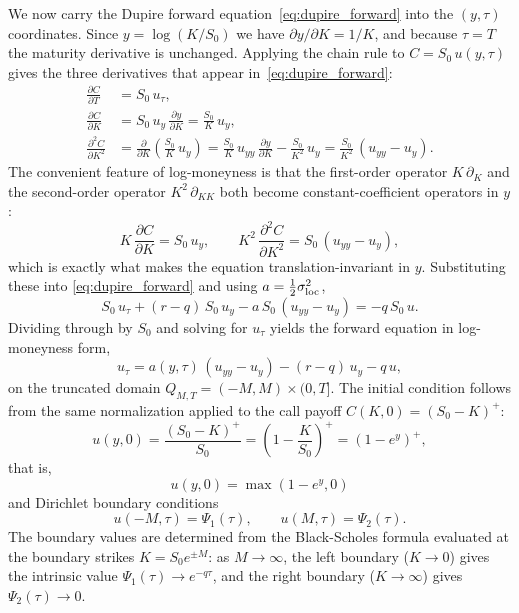 We now carry the Dupire forward equation~\eqref{eq:dupire_forward} into the
$(y,\tau)$ coordinates. Since $y = \log(K/S_0)$ we have $\partial y/\partial K = 1/K$,
and because $\tau = T$ the maturity derivative is unchanged.
Applying the chain rule to $C = S_0\,u(y,\tau)$ gives the three derivatives that appear
in~\eqref{eq:dupire_forward}:
\begin{equation*}
\begin{aligned}
    \frac{\partial C}{\partial T}
        &= S_0\,u_\tau, \\
    \frac{\partial C}{\partial K}
        &= S_0\,u_y\,\frac{\partial y}{\partial K}
         = \frac{S_0}{K}\,u_y, \\
    \frac{\partial^2 C}{\partial K^2}
        &= \frac{\partial}{\partial K}\!\left(\frac{S_0}{K}\,u_y\right)
         = \frac{S_0}{K}\,u_{yy}\,\frac{\partial y}{\partial K} - \frac{S_0}{K^2}\,u_y
         = \frac{S_0}{K^2}\,(u_{yy} - u_y).
\end{aligned}
\end{equation*}
The convenient feature of log-moneyness is that the first-order operator $K\,\partial_K$
and the second-order operator $K^2\,\partial_{KK}$ both become constant-coefficient
operators in $y$:
\begin{equation*}
    K\,\frac{\partial C}{\partial K} = S_0\,u_y,
    \qquad
    K^2\,\frac{\partial^2 C}{\partial K^2} = S_0\,(u_{yy} - u_y),
\end{equation*}
which is exactly what makes the equation translation-invariant in $y$.
Substituting these into \eqref{eq:dupire_forward} and using $a = \tfrac12\sigma_{\mathrm{loc}}^2$,
\begin{equation*}
    S_0\,u_\tau + (r-q)\,S_0\,u_y - a\,S_0\,(u_{yy} - u_y) = -q\,S_0\,u.
\end{equation*}
Dividing through by $S_0$ and solving for $u_\tau$ yields the forward equation in
log-moneyness form,
\begin{equation}\label{eq:inverse_pde_1}
    u_\tau = a(y,\tau)\,(u_{yy} - u_y) - (r-q)\,u_y - q\,u,
\end{equation}
on the truncated domain $Q_{M,T} = (-M, M) \times (0, T]$.
The initial condition follows from the same normalization applied to the
call payoff $C(K,0) = (S_0 - K)^+$:
\begin{equation*}
    u(y,0) = \frac{(S_0 - K)^+}{S_0} = \left(1 - \frac{K}{S_0}\right)^{\!+} = (1 - e^{y})^+,
\end{equation*}
that is,
\begin{equation}\label{eq:inverse_pde_3}
    u(y, 0) = \max(1 - e^y, 0)
\end{equation}
and Dirichlet boundary conditions
\begin{equation}\label{eq:inverse_pde_2}
    u(-M, \tau) = \Psi_1(\tau), \qquad u(M, \tau) = \Psi_2(\tau).
\end{equation}
The boundary values are determined from the Black-Scholes formula evaluated
at the boundary strikes $K = S_0 e^{\pm M}$:
as $M \to \infty$, the left boundary ($K \to 0$) gives the intrinsic value
$\Psi_1(\tau) \to e^{-q\tau}$, and the right boundary ($K \to \infty$) gives $\Psi_2(\tau) \to 0$.


